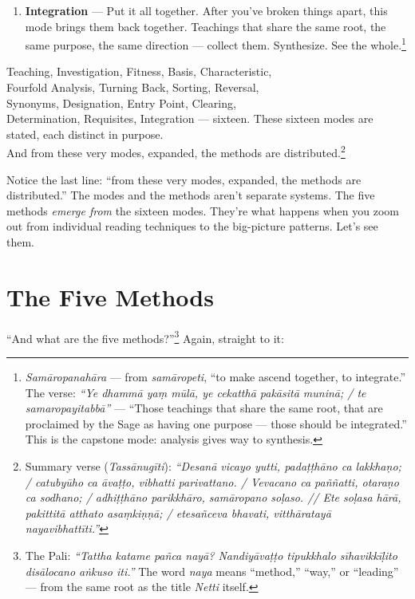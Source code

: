 \begin{enumerate}[leftmargin=*, itemsep=8pt]
\item \textbf{Integration} --- Put it all together. After you've broken things apart, this mode brings them back together. Teachings that share the same root, the same purpose, the same direction --- collect them. Synthesize. See the whole.\footnote{\textit{Samāropanahāra} --- from \textit{samāropeti}, ``to make ascend together, to integrate.'' The verse: \textit{``Ye dhammā yaṃ mūlā, ye cekatthā pakāsitā muninā; / te samaropayitabbā''} --- ``Those teachings that share the same root, that are proclaimed by the Sage as having one purpose --- those should be integrated.'' This is the capstone mode: analysis gives way to synthesis.}
\end{enumerate}

\begin{versebox}
Teaching, Investigation, Fitness, Basis, Characteristic,\\
Fourfold Analysis, Turning Back, Sorting, Reversal,\\
Synonyms, Designation, Entry Point, Clearing,\\
Determination, Requisites, Integration --- sixteen.
\stanza
These sixteen modes are stated, each distinct in purpose.\\
And from these very modes, expanded, the methods are distributed.\footnote{Summary verse (\textit{Tassānugīti}): \textit{``Desanā vicayo yutti, padaṭṭhāno ca lakkhaṇo; / catubyūho ca āvaṭṭo, vibhatti parivattano. / Vevacano ca paññatti, otaraṇo ca sodhano; / adhiṭṭhāno parikkhāro, samāropano soḷaso. // Ete soḷasa hārā, pakittitā atthato asaṃkiṇṇā; / etesañceva bhavati, vitthāratayā nayavibhattīti.''}}
\end{versebox}

Notice the last line: ``from these very modes, expanded, the methods are distributed.'' The modes and the methods aren't separate systems. The five methods \textit{emerge from} the sixteen modes. They're what happens when you zoom out from individual reading techniques to the big-picture patterns. Let's see them.

\ornament

\section*{The Five Methods}

``And what are the five methods?''\footnote{The Pali: \textit{``Tattha katame pañca nayā? Nandiyāvaṭṭo tipukkhalo sīhavikkīḷito disālocano aṅkuso iti.''} The word \textit{naya} means ``method,'' ``way,'' or ``leading'' --- from the same root as the title \textit{Netti} itself.} Again, straight to it:

